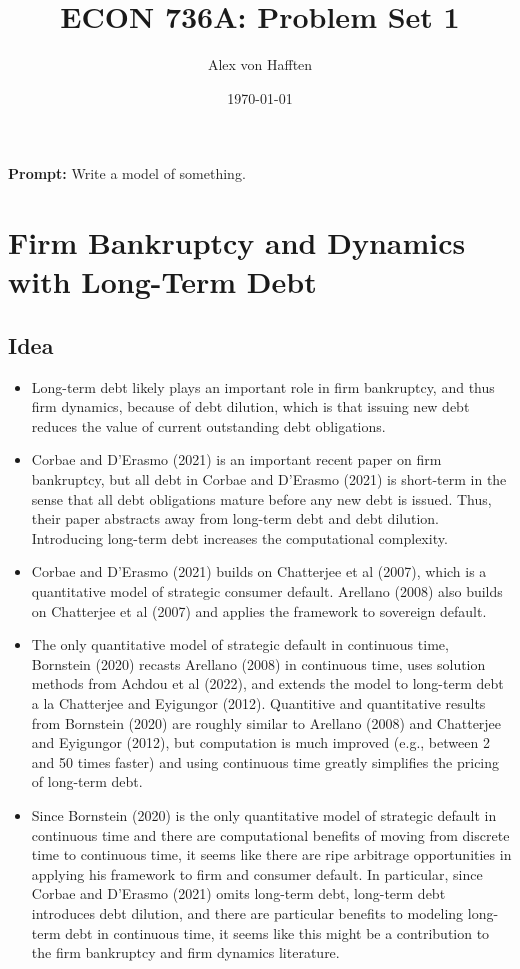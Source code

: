 \documentclass{article}
\title{ECON 736A: Problem Set 1}
\author{Alex von Hafften}
\date{\today}
\begin{document}
\maketitle

\textbf{Prompt:} Write a model of something.

\section*{Firm Bankruptcy and Dynamics with Long-Term Debt}

\subsection*{Idea}

\begin{itemize}

\item Long-term debt likely plays an important role in firm bankruptcy, and thus firm dynamics, because of debt dilution, which is that issuing new debt reduces the value of current outstanding debt obligations.

\item Corbae and D'Erasmo (2021) is an important recent paper on firm bankruptcy, but all debt in Corbae and D'Erasmo (2021) is short-term in the sense that all debt obligations mature before any new debt is issued. Thus, their paper abstracts away from long-term debt and debt dilution. Introducing long-term debt increases the computational complexity.

\item Corbae and D'Erasmo (2021) builds on Chatterjee et al (2007), which is a quantitative model of strategic consumer default. Arellano (2008) also builds on Chatterjee et al (2007) and applies the framework to sovereign default.

\item The only quantitative model of strategic default in continuous time, Bornstein (2020) recasts Arellano (2008) in continuous time, uses solution methods from Achdou et al (2022), and extends the model to long-term debt a la Chatterjee and Eyigungor (2012). Quantitive and quantitative results from Bornstein (2020) are roughly similar to Arellano (2008) and Chatterjee and Eyigungor (2012), but computation is much improved (e.g., between 2 and 50 times faster) and using continuous time greatly simplifies the pricing of long-term debt.

\item Since Bornstein (2020) is the only quantitative model of strategic default in continuous time and there are computational benefits of moving from discrete time to continuous time, it seems like there are ripe arbitrage opportunities in applying his framework to firm and consumer default.  In particular, since Corbae and D'Erasmo (2021) omits long-term debt, long-term debt introduces debt dilution, and there are particular benefits to modeling long-term debt in continuous time, it seems like this might be a contribution to the firm bankruptcy and firm dynamics literature.

\end{itemize}
\end{document}
